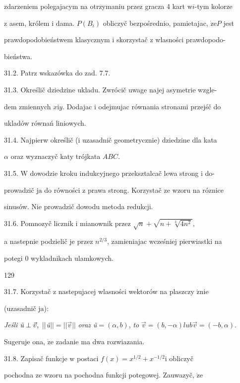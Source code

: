 \documentclass[a4paper,12pt]{article}
\begin{document}
zdarzeniem polegajacym na otrzymaniu przez gracza 4 kart $\mathrm{w}i$-tym kolorze

$\mathrm{z}$ asem, królem $\mathrm{i}$ dama. $P(B_{i})$ obliczyč bezpośrednio, pamietajac, $\dot{\mathrm{z}}\mathrm{e}P$ jest

prawdopodobieństwem klasycznym $\mathrm{i}$ skorzystač $\mathrm{z}$ wlasności prawdopodo-

bieństwa.

31.2. Patrz wskazówka do zad. 7.7.

31.3. Określič dziedzine ukladu. Zwrócič uwage najej asymetrie wzgle-

dem zmiennych $x\mathrm{i}y$. Dodajac $\mathrm{i}$ odejmujac równania stronami przejśč do

ukladów równań liniowych.

31.4. Najpierw określič ($\mathrm{i}$ uzasadnič geometrycznie) dziedzine dla kata

$\alpha$ oraz wyznaczyč katy trójkata $ABC.$

31.5. $\mathrm{W}$ dowodzie kroku indukcyjnego przeksztalcač lewa strong $\mathrm{i}$ do-

prowadzič $\mathrm{j}\mathrm{a}$ do równości $\mathrm{z}$ prawa strong. Korzystač ze wzoru na róznice

sinusów. Nie prowadzič dowodu metoda redukcji.

31.6. Pomnozyč licznik $\mathrm{i}$ mianownik przez $\sqrt{n} + \sqrt{n+\sqrt[3]{4n^{2}}},$

a nastepnie podzielič je przez $n^{2/3}$, zamieniajac wcześniej pierwiastki na

potegi $0$ wykladnikach ulamkowych.





129

31.7. Korzystač $\mathrm{z}$ nastepujacej wlasności wektorów na plaszczy $\acute{\mathrm{z}}\mathrm{n}\mathrm{i}\mathrm{e}$

(uzasadnič $\mathrm{j}\mathrm{a}$):

{\it Jeśli} $\text{{\it ũ}}\perp\vec{v},\ ||${\it ũ}$|| =||\vec{v}||$ {\it oraz ũ}$= (\alpha,b)$, {\it to} $\vec{v}=(b,-\alpha) lub\vec{v}=(-b,\alpha).$

Sugeruje ona, $\dot{\mathrm{z}}\mathrm{e}$ zadanie ma dwa rozwiazania.

31.8. Zapisač funkcje $\mathrm{w}$ postaci $f(x) = x^{1/2} +x^{-1/2} \mathrm{i}$ obliczyč

pochodna ze wzoru na pochodna funkcji potegowej. Zauwazyč, $\dot{\mathrm{z}}\mathrm{e}$
\end{document}
